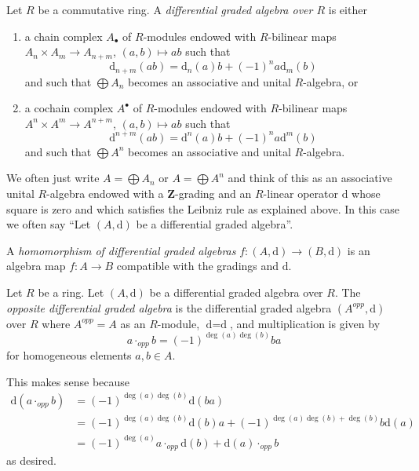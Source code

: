 \begin{definition}
\label{definition-dga}
Let $R$ be a commutative ring. A {\it differential graded algebra over $R$}
is either
\begin{enumerate}
\item a chain complex $A_\bullet$ of $R$-modules endowed with
$R$-bilinear maps $A_n \times A_m \to A_{n + m}$,
$(a, b) \mapsto ab$ such that
$$
\text{d}_{n + m}(ab) = \text{d}_n(a)b + (-1)^n a\text{d}_m(b)
$$
and such that $\bigoplus A_n$ becomes an associative and unital
$R$-algebra, or
\item a cochain complex $A^\bullet$ of $R$-modules endowed with
$R$-bilinear maps $A^n \times A^m \to A^{n + m}$, $(a, b) \mapsto ab$
such that
$$
\text{d}^{n + m}(ab) = \text{d}^n(a)b + (-1)^n a\text{d}^m(b)
$$
and such that $\bigoplus A^n$ becomes an associative and unital $R$-algebra.
\end{enumerate}
\end{definition}

\noindent
We often just write $A = \bigoplus A_n$ or $A = \bigoplus A^n$ and
think of this as an associative unital $R$-algebra endowed with a
$\mathbf{Z}$-grading and an $R$-linear operator $\text{d}$ whose square
is zero and which satisfies the Leibniz rule as explained above. In this case
we often say ``Let $(A, \text{d})$ be a differential graded algebra''.

\begin{definition}
\label{definition-homomorphism-dga}
A {\it homomorphism of differential graded algebras}
$f : (A, \text{d}) \to (B, \text{d})$ is an algebra map $f : A \to B$
compatible with the gradings and $\text{d}$.
\end{definition}

\begin{definition}
\label{definition-opposite-dga}
Let $R$ be a ring. Let $(A, \text{d})$ be a differential graded algebra
over $R$. The {\it opposite differential graded algebra} is the differential
graded algebra $(A^{opp}, \text{d})$ over $R$ where $A^{opp} = A$
as an $R$-module, $\text{d} = \text{d}$, and multiplication is
given by
$$
a \cdot_{opp} b = (-1)^{\deg(a)\deg(b)} b a
$$
for homogeneous elements $a, b \in A$.
\end{definition}

\noindent
This makes sense because
\begin{align*}
\text{d}(a \cdot_{opp} b)
& =
(-1)^{\deg(a)\deg(b)} \text{d}(b a) \\
& =
(-1)^{\deg(a)\deg(b)} \text{d}(b) a +
(-1)^{\deg(a)\deg(b) + \deg(b)}b\text{d}(a) \\
& =
(-1)^{\deg(a)}a \cdot_{opp} \text{d}(b) + \text{d}(a) \cdot_{opp} b
\end{align*}
as desired.

